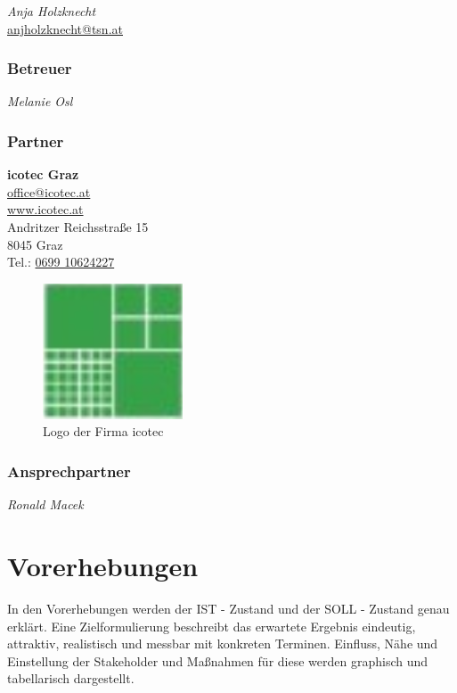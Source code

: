 \emph{Anja Holzknecht} \\
\href{mailto:anjholzknecht@tsn.at}{anjholzknecht@tsn.at} 
\begin{figure}
\end{figure}

\subsubsection{Betreuer}
\emph{Melanie Osl}

\subsubsection{Partner}
\textbf{icotec Graz} \\
\href{mailto:office@icotec.at}{office@icotec.at} \\
\href{www.icotec.at}{www.icotec.at} \\
Andritzer Reichsstraße 15 \\
8045 Graz \\
Tel.: \href{tel:069910624227}{0699 10624227}
\begin{figure}[H]
	\captionsetup{singlelinecheck = false, format= hang, justification=raggedright, font=footnotesize, labelsep=space}
	\includegraphics{figures/Logo_Projektpartner.png}
	\caption{Logo der Firma icotec}
	\label{fig:LogoProjektpartner}
\end{figure}

\subsubsection{Ansprechpartner}
\emph {Ronald Macek}
\begin{figure}
\end{figure}


\section{Vorerhebungen}
In den Vorerhebungen werden der IST - Zustand und der SOLL - Zustand genau erklärt. Eine Zielformulierung beschreibt das erwartete Ergebnis eindeutig, attraktiv, realistisch und messbar mit konkreten Terminen. Einfluss, Nähe und Einstellung der Stakeholder und Maßnahmen für diese werden graphisch und tabellarisch dargestellt.

